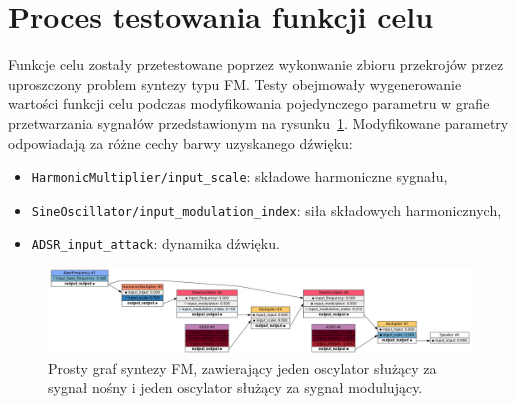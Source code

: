 \section{Proces testowania funkcji celu}

Funkcje celu zostały przetestowane poprzez wykonwanie
zbioru przekrojów przez uproszczony problem syntezy typu FM.
Testy obejmowały wygenerowanie wartości funkcji celu podczas
modyfikowania pojedynczego parametru w grafie przetwarzania sygnałów
przedstawionym na rysunku~\ref{fig:fm_graph_for_benchmarks}.
Modyfikowane parametry odpowiadają za różne cechy barwy uzyskanego dźwięku:

\begin{itemize}
  \item \texttt{HarmonicMultiplier/input\_scale}:  składowe harmoniczne sygnału,
  \item \texttt{SineOscillator/input\_modulation\_index}: siła składowych harmonicznych,
  \item \texttt{ADSR\_input\_attack}: dynamika dźwięku.
\end{itemize}

\begin{figure}[H]
    \centering
    \includegraphics[width=1.0\linewidth]{rys03/fm_graph_for_benchmarks.png}
    \caption{
      Prosty graf syntezy FM, zawierający jeden oscylator służący za sygnał nośny
      i jeden oscylator służący za sygnał modulujący.
    }
    \label{fig:fm_graph_for_benchmarks}
\end{figure}
